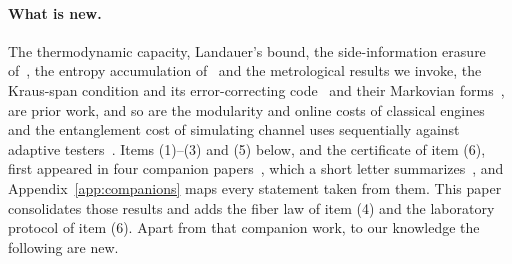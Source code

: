 \paragraph{What is new.} The thermodynamic capacity, Landauer's bound, the side-information erasure of~\cite{delRio11}, the entropy accumulation of~\cite{DFR20} and the metrological results we invoke, the Kraus-span condition and its error-correcting code~\cite{ZhouJiang21} and their Markovian forms~\cite{ZhouZhangPreskillJiang18,DemkowiczCzajkowskiSekatski17}, are prior work, and so are the modularity and online costs of classical engines~\cite{BMC18,LoomisCrutchfield20,Thompson25} and the entanglement cost of simulating channel uses sequentially against adaptive testers~\cite{Wilde18}. Items (1)--(3) and (5) below, and the certificate of item (6), first appeared in four companion papers~\cite{Order,SaveWork,Answering,KeepingTime}, which a short letter summarizes~\cite{Letter}, and Appendix~\ref{app:companions} maps every statement taken from them. This paper consolidates those results and adds the fiber law of item (4) and the laboratory protocol of item (6). Apart from that companion work, to our knowledge the following are new.
